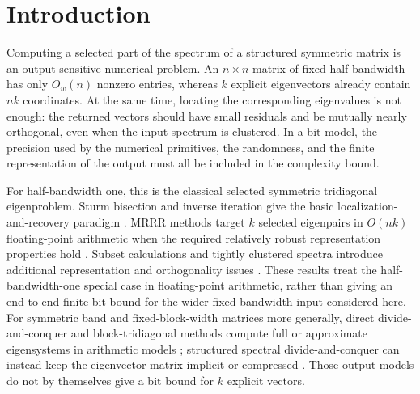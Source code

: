 \documentclass[11pt]{article}
\begin{document}
\section{Introduction}
\label{sec:introduction}

Computing a selected part of the spectrum of a structured symmetric matrix is
an output-sensitive numerical problem.  An $n\times n$ matrix of fixed
half-bandwidth has only $O_w(n)$ nonzero entries, whereas $k$ explicit
eigenvectors already contain $nk$ coordinates.  At the same time, locating
the corresponding eigenvalues is not enough: the returned vectors should
have small residuals and be mutually nearly orthogonal, even when the input
spectrum is clustered.  In a bit model, the precision used by the numerical
primitives, the randomness, and the finite representation of the output must
all be included in the complexity bound.

For half-bandwidth one, this is the classical selected symmetric
tridiagonal eigenproblem.  Sturm bisection and inverse iteration give the
basic localization-and-recovery paradigm
\cite{barthMartinWilkinson1967Bisection,wilkinson1962InverseIteration}.
MRRR methods target $k$ selected eigenpairs in $O(nk)$ floating-point
arithmetic when the required relatively robust representation properties hold
\cite{parlettDhillon2000RelativelyRobust,dhillonParlett2004MultipleRepresentations,dhillonParlettVomel2006DesignMRRR,willemsLang2013FrameworkMR3}.
Subset calculations and tightly clustered spectra introduce additional
representation and orthogonality issues
\cite{marquesParlettVomel2006Subsets,dhillonParlettVomel2005GluedMatrices,demmelEtAl2008TridiagonalEigensolvers}.
These results treat the half-bandwidth-one special case in floating-point
arithmetic, rather than giving an end-to-end finite-bit bound for the wider
fixed-bandwidth input considered here.  For symmetric band and
fixed-block-width matrices more generally, direct divide-and-conquer and
block-tridiagonal methods compute full or approximate eigensystems in
arithmetic models
\cite{arbenz1992Bandsymmetric,ganstererEtAl2001SymmetricBand,ganstererEtAl2003BlockTridiagonal};
structured spectral divide-and-conquer can instead keep the eigenvector
matrix implicit or compressed
\cite{vogelEtAl2016StructuredEigenvalue,susnjaraKressner2021Banded}.
Those output models do not by themselves give a bit bound for $k$ explicit
vectors.
\end{document}
